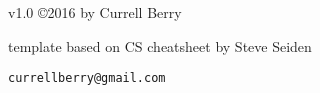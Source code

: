\centerline{v1.0 \copyright 2016 by Currell Berry}
\centerline{template based on CS cheatsheet by Steve Seiden}
\centerline{\tt currellberry@gmail.com}
